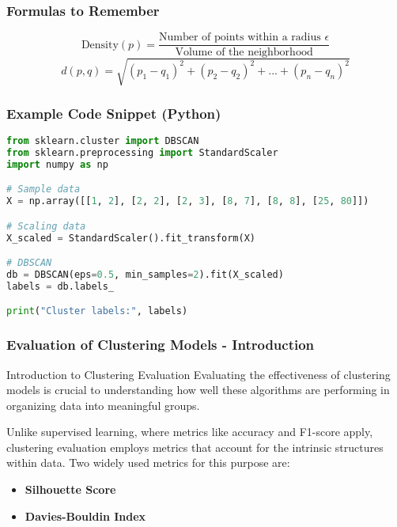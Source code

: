 \documentclass[aspectratio=169]{beamer}
\begin{document}
\begin{frame}[fragile]
    \frametitle{Formulas to Remember}
    \begin{equation}
        \text{Density}(p) = \frac{\text{Number of points within a radius } \epsilon}{\text{Volume of the neighborhood}}
        \label{eq:density}
    \end{equation}
    \begin{equation}
        d(p, q) = \sqrt{(p_1 - q_1)^2 + (p_2 - q_2)^2 + ... + (p_n - q_n)^2}
        \label{eq:distance}
    \end{equation}
\end{frame}

\begin{frame}[fragile]
    \frametitle{Example Code Snippet (Python)}
    \begin{lstlisting}[language=Python]
from sklearn.cluster import DBSCAN
from sklearn.preprocessing import StandardScaler
import numpy as np

# Sample data
X = np.array([[1, 2], [2, 2], [2, 3], [8, 7], [8, 8], [25, 80]])

# Scaling data
X_scaled = StandardScaler().fit_transform(X)

# DBSCAN
db = DBSCAN(eps=0.5, min_samples=2).fit(X_scaled)
labels = db.labels_

print("Cluster labels:", labels)
    \end{lstlisting}
\end{frame}

\begin{frame}[fragile]
    \frametitle{Evaluation of Clustering Models - Introduction}
    \begin{block}{Introduction to Clustering Evaluation}
        Evaluating the effectiveness of clustering models is crucial to understanding how well these algorithms are performing in organizing data into meaningful groups.
        
        Unlike supervised learning, where metrics like accuracy and F1-score apply, clustering evaluation employs metrics that account for the intrinsic structures within data. Two widely used metrics for this purpose are:
        \begin{itemize}
            \item \textbf{Silhouette Score}
            \item \textbf{Davies-Bouldin Index}
        \end{itemize}
    \end{block}
\end{frame}
\end{document}
